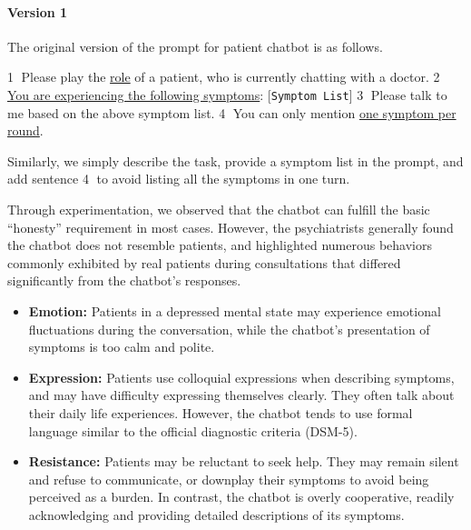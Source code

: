 \paragraph{Version 1}
The original version of the prompt for patient chatbot is as follows. 
\begin{prompt}
    \textcircled{1} Please play the \uline{role} of a patient, who is currently chatting with a doctor. 
    \textcircled{2} \uline{You are experiencing the following symptoms}: [\texttt{Symptom List}]\protect\footnotemark 
    \textcircled{3} Please talk to me based on the above symptom list. 
    \textcircled{4} You can only mention \uline{one symptom per round}. 
\end{prompt}
Similarly, we simply describe the task, provide a symptom list in the prompt, and add sentence \textcircled{4} to avoid listing all the symptoms in one turn. 

Through experimentation, we observed that the chatbot can fulfill the basic ``honesty'' requirement in most cases. However, the psychiatrists generally found the chatbot does not resemble patients, and highlighted numerous behaviors commonly exhibited by real patients during consultations that differed significantly from the chatbot's responses.

\begin{itemize}
    \item \textbf{Emotion:} Patients in a depressed mental state may experience emotional fluctuations during the conversation, while the chatbot's presentation of symptoms is too calm and polite. 
    \item \textbf{Expression:} Patients use colloquial expressions when describing symptoms, and may have difficulty expressing themselves clearly. They often talk about their daily life experiences. However, the chatbot tends to use formal language similar to the official diagnostic criteria (DSM-5).
    \item \textbf{Resistance:} Patients may be reluctant to seek help. They may remain silent and refuse to communicate, or downplay their symptoms to avoid being perceived as a burden. In contrast, the chatbot is overly cooperative, readily acknowledging and providing detailed descriptions of its symptoms.
\end{itemize}

